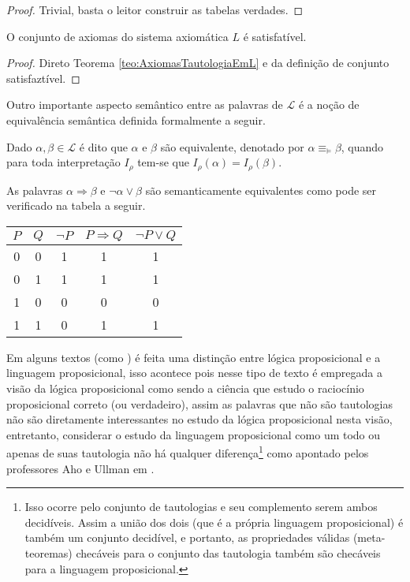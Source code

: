 \begin{proof}
  Trivial, basta o leitor construir as tabelas verdades.
\end{proof}

\begin{corolario}\label{col:AxiomasTautologiaEmL}
  O conjunto de axiomas do sistema axiomática $L$ é satisfatível.
\end{corolario}

\begin{proof}
  Direto Teorema \ref{teo:AxiomasTautologiaEmL} e da definição de conjunto satisfaztível.
\end{proof}

Outro importante aspecto semântico entre as palavras de $\mathcal{L}$ é a noção de equivalência semântica definida formalmente a seguir.

\begin{definicao}\label{def:EquivalenciaSemantica}
  Dado $\alpha, \beta \in \mathcal{L}$ é dito que $\alpha$ e $\beta$ são equivalente, denotado por $\alpha \equiv_\vDash \beta$, quando para toda interpretação $I_\rho$ tem-se que $I_\rho(\alpha) = I_\rho(\beta)$.
\end{definicao}

\begin{exemplo}
  As palavras $\alpha \Rightarrow \beta$ e $\neg \alpha \lor \beta$ são semanticamente equivalentes como pode ser verificado na tabela a seguir.

  \begin{table}[H]
    \centering
    \begin{tabular}{|c|c|c|c|c|}
        \hline
        $P$ & $Q$ & $\neg P$ & $P \Rightarrow Q$ & $\neg P \lor Q$\\
        \hline
        0 & 0 & 1 & 1 & 1\\ \hline
        0 & 1 & 1 & 1 & 1\\ \hline
        1 & 0 & 0 & 0 & 0\\ \hline
        1 & 1 & 0 & 1 & 1\\ \hline
    \end{tabular}
  \end{table}
\end{exemplo}

Em alguns textos (como \cite{benja-Logica}) é feita uma distinção entre lógica proposicional e a linguagem proposicional, isso acontece pois nesse tipo de texto é empregada a visão da lógica proposicional como sendo a ciência que estudo o raciocínio proposicional correto (ou verdadeiro), assim as palavras que não são tautologias não são diretamente interessantes no estudo da lógica proposicional nesta visão, entretanto, considerar o estudo da linguagem proposicional como um todo ou apenas de suas tautologia não há qualquer diferença\footnote{Isso ocorre pelo conjunto de tautologias e seu complemento serem ambos decidíveis. Assim a união dos dois (que é a própria linguagem proposicional) é também um conjunto decidível, e portanto, as propriedades válidas (meta-teoremas) checáveis para o conjunto das tautologia também são checáveis para a linguagem proposicional.} como apontado pelos professores Aho e Ullman em \cite{ullman1992}.

